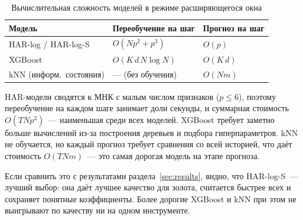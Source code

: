 \begin{table}[H]
\centering
\small
\caption{Вычислительная сложность моделей в режиме расширяющегося окна}
\label{tab:complexity}
\begin{tabular}{lll}
\hline
Модель & Переобучение на шаг & Прогноз на шаг \\
\hline
HAR-log / HAR-log-S & $O(N p^2 + p^3)$ & $O(p)$ \\
XGBoost & $O(K\, d\, N \log N)$ & $O(K\, d)$ \\
kNN (информ.\ состояния) & --- (без обучения) & $O(N m)$ \\
\hline
\end{tabular}
\end{table}

HAR-модели сводятся к МНК с малым числом признаков ($p \le 6$), поэтому
переобучение на каждом шаге занимает доли секунды, и суммарная стоимость
$O\!\left(T N p^2\right)$~--- наименьшая среди всех моделей. XGBoost требует
заметно больше вычислений из-за построения деревьев и подбора гиперпараметров.
kNN не обучается, но каждый прогноз требует сравнения со всей историей, что
даёт стоимость $O\!\left(T N m\right)$~--- это самая дорогая модель на этапе
прогноза.

Если сравнить это с результатами раздела~\ref{sec:results}, видно, что
HAR-log-S~--- лучший выбор: она даёт лучшее качество для золота, считается
быстрее всех и сохраняет понятные коэффициенты. Более дорогие XGBoost и kNN
при этом не выигрывают по качеству ни на одном инструменте.
